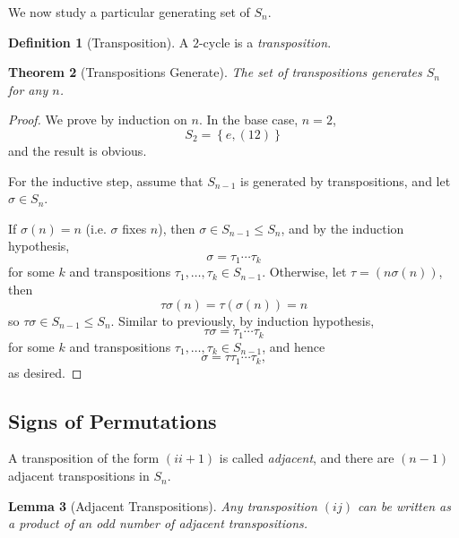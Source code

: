 \documentclass{article}
\newtheorem{theorem}{Theorem}[section]
\newtheorem{lemma}[theorem]{Lemma}
\theoremstyle{definition}
\newtheorem{definition}[theorem]{Definition}
\theoremstyle{remark}
\newcommand{\pqty}[1]{\left(#1\right)}
\newcommand{\Bqty}[1]{\left\{#1\right\}}
\newcommand{\perm}[1]{(#1)}
\newcommand{\subgroup}{\leq}
\begin{document}
We now study a particular generating set of \(S_n\).

\begin{definition}[Transposition]
    \label{def:transposition}%
    A \(2\)-cycle is a \emph{transposition}.
\end{definition}

\begin{theorem}[Transpositions Generate]
    \label{thm:transposition-generate}%
    The set of transpositions generates \(S_n\) for any \(n\).
\end{theorem}

\begin{proof}
    We prove by induction on \(n\). In the base case, \(n = 2\),
    \[
        S_2 = \Bqty{e, \perm{12}}
    \]
    and the result is obvious.

    For the inductive step, assume that \(S_{n - 1}\) is generated by transpositions, and let \(\sigma \in S_n\).

    If \(\sigma\pqty{n} = n\) (i.e. \(\sigma\) fixes \(n\)), then \(\sigma \in S_{n - 1} \subgroup S_n\), and by the induction hypothesis,
    \[
        \sigma = \tau_1 \cdots \tau_k
    \]
    for some \(k\) and transpositions \(\tau_1, \ldots, \tau_k \in S_{n - 1}\). Otherwise, let \(\tau = \perm{n {\sigma\pqty{n}}}\), then
    \[
        \tau \sigma \pqty{n} = \tau\pqty{\sigma\pqty{n}} = n
    \]
    so \(\tau \sigma \in S_{n - 1} \subgroup S_n\). Similar to previously, by induction hypothesis,
    \[
        \tau \sigma = \tau_1 \cdots \tau_k
    \]
    for some \(k\) and transpositions \(\tau_1, \ldots, \tau_k \in S_{n - 1}\), and hence
    \[
        \sigma = \tau \tau_1 \cdots \tau_k,
    \]
    as desired.
\end{proof}

\subsection{Signs of Permutations}
\label{sec:signs-of-permutations}

A transposition of the form \(\perm{i {i + 1}}\) is called \emph{adjacent}, and there are \(\pqty{n - 1}\) adjacent transpositions in \(S_n\).

\begin{lemma}[Adjacent Transpositions]
    \label{lem:adjacent-transpositions}%
    Any transposition \(\perm{ij}\) can be written as a product of an \emph{odd} number of adjacent transpositions.
\end{lemma}
\end{document}
